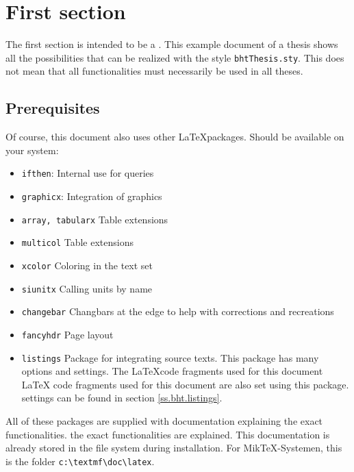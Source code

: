 
\chapter{First section}

The first section is intended to be a .   This example document of a thesis shows all the possibilities that can be realized with the style \texttt{bhtThesis.sty}.  This does not mean that all functionalities must necessarily be used in all theses.

\section{Prerequisites}
Of course, this document also uses other \LaTeX packages. Should be available on your system:

\begin{itemize}
\item \texttt{ifthen}:  Internal use for queries
\item \texttt{graphicx}: 
  Integration of graphics
\item \texttt{array, tabularx}                  
  Table extensions
\item \texttt{multicol}                       
  Table extensions
\item \texttt{xcolor}                           
  Coloring in the text set
\item \texttt{siunitx}
   Calling units by name
\item \texttt{changebar}
  Changbars at the edge to help with corrections and recreations
\item \texttt{fancyhdr} Page layout
\item \texttt{listings} Package for integrating source texts. This package has many options and settings. The \LaTeX code fragments used for this document LaTeX code fragments used for this document are also set using this package. settings can be found in section \ref{ss.bht.listings}.
\end{itemize}

All of these packages are supplied with documentation explaining the exact functionalities.
the exact functionalities are explained. This documentation is already stored in the file system during installation. For  Mik\TeX-Systemen, this is the folder \verb|c:\textmf\doc\latex|.

